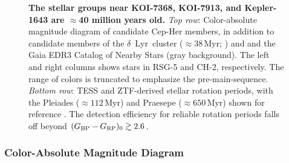 \documentclass[12pt,twocolumn,linenumbers]{aastex63}
\newcommand{\bpmrpo}{(G_{\rm BP}-G_{\rm RP})_0}
\begin{document}
\begin{figure}[tp]
\begin{center}
		\vspace{-0.6cm}
	\end{center}
	\vspace{-0.7cm}
	\caption{
		{\bf The stellar groups near KOI-7368, KOI-7913, and Kepler-1643
    are $\approx$40 million years old.} 
    {\it Top row}: 
    Color-absolute magnitude diagram of candidate Cep-Her members, in
    addition to candidate members of the $\delta$~Lyr~cluster
    ($\approx38$\,Myr; \citealt{bouma_kep1627_2022}) and and the Gaia
    EDR3 Catalog of Nearby Stars (gray background).  The left and
    right columns shows stars in RSG-5 and CH-2, respectively.  The
    range of colors is truncated to emphasize the pre-main-sequence.
    {\it Bottom row}:
    TESS and ZTF-derived stellar rotation periods, with the Pleiades
    ($\approx 112$\,Myr) and Praesepe ($\approx 650$\,Myr) shown for reference
    \citep{rebull_rotation_2016a,douglas_poking_2017}.
    The detection efficiency for reliable rotation periods falls off
    beyond $\bpmrpo \gtrsim 2.6$.
	\label{fig:age}
	}
\end{figure}

\subsubsection{Color-Absolute Magnitude Diagram}
\label{sec:camd}
\end{document}
